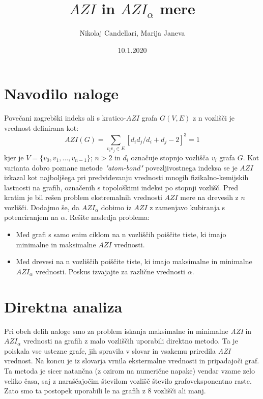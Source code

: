 \documentclass[11pt]{article} %
\title{$AZI$ in ${AZI}_{\alpha}$ mere}
\author{Nikolaj Candellari, Marija Janeva}
\date{10.1.2020} %
\begin{document}
\maketitle

\section{Navodilo naloge}
Povečani zagrebški indeks ali s kratico-$AZI$ grafa $G(V, E)$ z n vozlišči je vrednost definirana kot:
\[ AZI(G) = \sum_{{v}_{i} {v}_{j} \in E }[{{d}_{i} {d}_{j}}/{{d}_{i} + {d}_{j} - 2}]^3 = 1 \]
kjer je $V = \{ {v}_{0}, {v}_{1}, \dots , {v}_{n-1} \}$; $n > 2$ in $d_i$ označuje stopnjo vozlišča $v_i$ grafa $G$. Kot varianta dobro poznane metode \textit{"atom-bond"} povezljivostnega indeksa se je $AZI$ izkazal kot najboljšega pri predvidevanju vrednosti mnogih fizikalno-kemijskih lastnosti na grafih, označenih s topološkimi indeksi po stopnji vozlišč. Pred kratim je bil rešen problem ekstremalnih vrednosti $AZI$ mere na drevesih z $n$ vozlišči. Dodajmo še, da $AZI_{\alpha}$ dobimo iz $AZI$ z zamenjavo kubiranja s potenciranjem na $\alpha$. Rešite nasledja problema:

\begin{itemize}
\item{ Med grafi s samo enim ciklom na n vozliščih poiščite tiste, ki imajo minimalne in maksimalne $AZI$ vrednosti.}
\item{ Med drevesi na n vozliščih poiščite tiste, ki imajo maksimalne in minimalne $AZI_{\alpha}$ vrednosti. Poskus izvajajte za različne vrednosti $\alpha$.}
\end{itemize}

\section{Direktna analiza}

Pri obeh delih naloge smo za problem iskanja maksimalne in minimalne \textit{AZI} in $\textit{AZI}_{\alpha}$ vrednosti na grafih z malo vozliščih uporabili direktno metodo. Ta je poiskala vse ustezne grafe, jih spravila v slovar in vsakemu priredila \textit{AZI} vrednost. Na koncu je iz slovarja vrnila ekstermalne vrednosti in pripadajoči graf. Ta metoda je sicer natančna (z ozirom na numerične napake) vendar vzame zelo veliko časa, saj z naraščajočim številom vozlišč število grafoveksponentno raste. Zato smo ta postopek uporabili le na grafih z 8 vozlišči ali manj.\\
\end{document}
